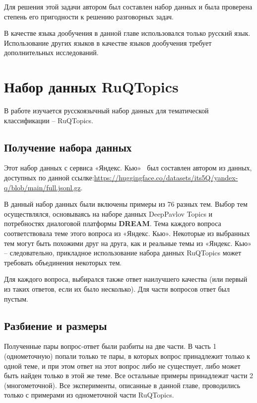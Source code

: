 Для решения этой задачи автором был составлен набор данных и была проверена степень его пригодности к решению разговорных задач.

В качестве языка дообучения в данной главе использовался только русский язык. Использование других языков в качестве языков дообучения требует дополнительных исследований.

\section{Набор данных {RuQTopics}}

В работе изучается русскоязычный набор данных для тематической классификации -- {RuQTopics}.
\subsection{Получение набора данных}
Этот набор данных с сервиса «Яндекс. Кью»~\cite{yandex_q} был составлен автором из данных, доступных по данной ссылке:\url{https://huggingface.co/datasets/its5Q/yandex-q/blob/main/full.jsonl.gz}.

В данный набор данных были включены примеры из 76 разных тем. Выбор тем осуществлялся, основываясь на наборе данных {DeepPavlov Topics} и потребностях диалоговой платформы \textbf{DREAM}. Тема каждого вопроса соответствовала теме этого вопроса из «Яндекс. Кью». Некоторые из выбранных тем могут быть похожими друг на друга, как и реальные темы из «Яндекс. Кью» -- следовательно, прикладное использование набора данных {RuQTopics} может требовать объединения некоторых тем.

 Для каждого вопроса, выбирался также ответ наилучшего качества (или первый из таких ответов, если их было несколько). Для части вопросов ответ был пустым. 
 


\subsection{Разбиение и размеры}
Полученные пары вопрос-ответ были разбиты на две части. В часть 1 (однометочную) попали только те пары, в которых вопрос принадлежит только к одной теме, и при этом ответ на этот вопрос либо не существует, либо может быть найден только в этой же теме. Все остальные примеры принадлежат части 2 (многометочной). Все эксперименты, описанные в данной главе, проводились только с примерами из однометочной части {RuQTopics}.


